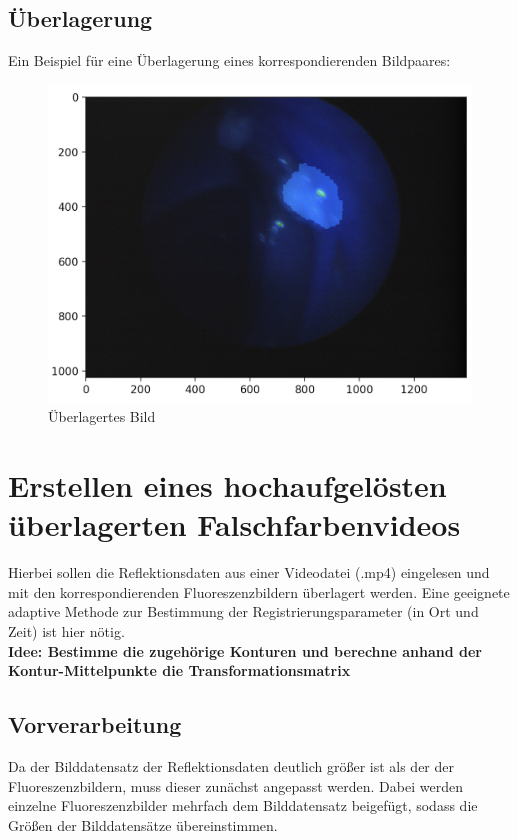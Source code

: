 \documentclass[conference]{IEEEtran}
\begin{document}
\subsection{Überlagerung}

Ein Beispiel für eine Überlagerung eines korrespondierenden Bildpaares:

\begin{figure}[h]
\includegraphics[scale=0.22]{Fig2}
\caption{Überlagertes Bild}
\end{figure}

\section{Erstellen eines hochaufgelösten überlagerten Falschfarbenvideos} 

Hierbei sollen die Reflektionsdaten aus einer Videodatei (.mp4) eingelesen und mit den korrespondierenden Fluoreszenzbildern überlagert werden. Eine geeignete adaptive Methode zur Bestimmung der Registrierungsparameter (in Ort und Zeit) ist hier nötig. \\

\textbf{Idee: Bestimme die zugehörige Konturen und berechne anhand der Kontur-Mittelpunkte die Transformationsmatrix} \\

\subsection{Vorverarbeitung}

Da der Bilddatensatz der Reflektionsdaten deutlich größer ist als der der Fluoreszenzbildern, muss dieser zunächst angepasst werden. Dabei werden einzelne Fluoreszenzbilder mehrfach dem Bilddatensatz beigefügt, sodass die Größen der Bilddatensätze übereinstimmen. \\
\end{document}
